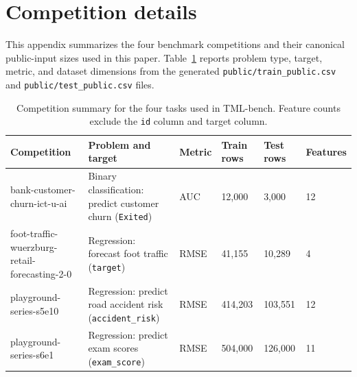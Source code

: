 \clearpage
\section{Competition details}
\label{sec:appendix-competition-details}

This appendix summarizes the four benchmark competitions and their canonical public-input sizes used in this paper. Table~\ref{tab:competition-details} reports problem type, target, metric, and dataset dimensions from the generated \texttt{public/train\_public.csv} and \texttt{public/test\_public.csv} files.

\begin{table}[H]
\centering
\scriptsize
\setlength{\tabcolsep}{4pt}
\begin{tabular}{p{4.15cm}p{3.05cm}p{0.95cm}p{1.1cm}p{1.1cm}p{1.35cm}}
\toprule
Competition & Problem and target & Metric & Train rows & Test rows & Features \\
\midrule
bank-customer-churn-ict-u-ai & Binary classification: predict customer churn (\texttt{Exited}) & AUC & 12,000 & 3,000 & 12 \\
foot-traffic-wuerzburg-retail-forecasting-2-0 & Regression: forecast foot traffic (\texttt{target}) & RMSE & 41,155 & 10,289 & 4 \\
playground-series-s5e10 & Regression: predict road accident risk (\texttt{accident\_risk}) & RMSE & 414,203 & 103,551 & 12 \\
playground-series-s6e1 & Regression: predict exam scores (\texttt{exam\_score}) & RMSE & 504,000 & 126,000 & 11 \\
\bottomrule
\end{tabular}
\caption{Competition summary for the four tasks used in TML-bench. Feature counts exclude the \texttt{id} column and target column.}
\label{tab:competition-details}
\end{table}
